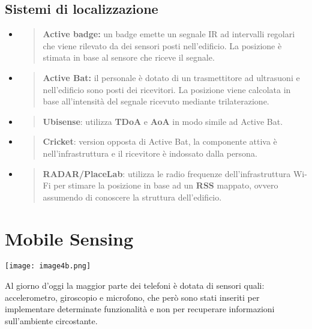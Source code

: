 \subsection{Sistemi di localizzazione}\label{sistemi-di-localizzazione}

\begin{itemize}
\item
  \begin{quote}
  \textbf{Active badge:} un badge emette un segnale IR ad intervalli
  regolari che viene rilevato da dei sensori posti nell'edificio. La
  posizione è stimata in base al sensore che riceve il segnale.
  \end{quote}
\item
  \begin{quote}
  \textbf{Active Bat:} il personale è dotato di un trasmettitore ad
  ultrasuoni e nell'edificio sono posti dei ricevitori. La posizione
  viene calcolata in base all'intensità del segnale ricevuto mediante
  trilaterazione.
  \end{quote}
\item
  \begin{quote}
  \textbf{Ubisense}: utilizza \textbf{TDoA} e \textbf{AoA} in modo
  simile ad Active Bat.
  \end{quote}
\item
  \begin{quote}
  \textbf{Cricket}: version opposta di Active Bat, la componente attiva
  è nell'infrastruttura e il ricevitore è indossato dalla persona.
  \end{quote}
\item
  \begin{quote}
  \textbf{RADAR/PlaceLab}: utilizza le radio frequenze
  dell'infrastruttura Wi-Fi per stimare la posizione in base ad un
  \textbf{RSS} mappato, ovvero assumendo di conoscere la struttura
  dell'edificio.
  \end{quote}
\end{itemize}

\section{Mobile Sensing}\label{mobile-sensing}

\texttt{[image: image4b.png]}

Al giorno d'oggi la maggior parte dei telefoni è dotata di sensori
quali: accelerometro, giroscopio e microfono, che però sono stati
inseriti per implementare determinate funzionalità e non per recuperare
informazioni sull'ambiente circostante.

